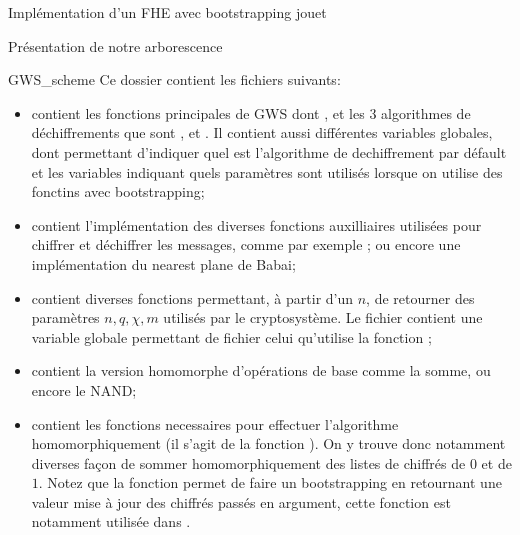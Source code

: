 \begin{section}{Implémentation d'un FHE avec bootstrapping \og{} jouet\fg{}}
\begin{subsection}{Présentation de notre arborescence}
\begin{subsubsection}{GWS\_scheme}
Ce dossier contient les fichiers suivants:
\begin{itemize}
\item {} contient les fonctions principales de GWS
dont ,  et les 3 algorithmes de
déchiffrements que sont , 
et . Il contient aussi différentes variables
globales, dont  permettant d'indiquer quel est
l'algorithme de dechiffrement par défault et les variables 
 indiquant quels paramètres sont utilisés lorsque 
on utilise des fonctins avec bootstrapping;
\item {} contient l'implémentation 
	des diverses fonctions auxilliaires utilisées pour chiffrer 
	et déchiffrer les messages, comme par exemple ;
	ou encore une implémentation du nearest plane de Babai;
\item {} contient diverses fonctions permettant, à 
	partir d'un $n$, de retourner des paramètres $n, q, \chi, m$
	utilisés par le cryptosystème. Le fichier 
	contient une variable globale 
	permettant de fichier celui qu'utilise la fonction
	;
\item {} contient la version homomorphe
	d'opérations de base comme la somme, ou encore le NAND;
\item {} contient les fonctions necessaires pour
	effectuer l'algorithme  homomorphiquement
	(il s'agit de la fonction ). On y trouve
	donc notamment diverses façon de sommer homomorphiquement
	des listes de chiffrés de $0$ et de $1$. Notez que la fonction
	 permet de faire un bootstrapping
	en retournant une valeur \og mise à jour \fg des chiffrés
	passés en argument, cette fonction est notamment utilisée dans 
	.
\end{itemize}
\end{subsubsection} %


\end{subsection}
\end{section}
